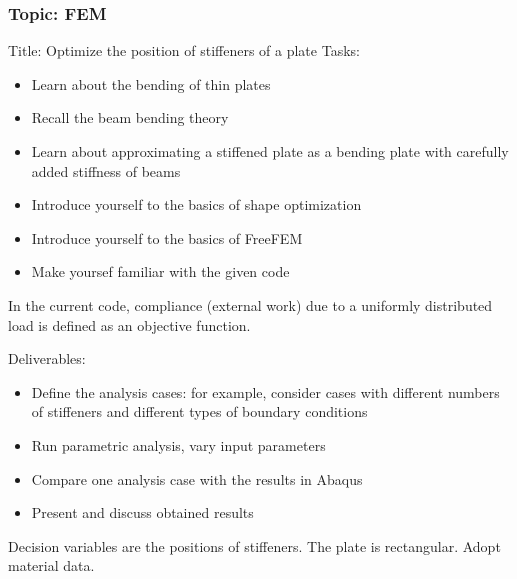 \documentclass[10pt
 ,aspectratio=1610
]{beamer}	%
\begin{document}

% 

\begin{frame}[c]
\frametitle{Topic: FEM}
Title: Optimize the position of stiffeners of a plate
\vfill
Tasks:
\begin{itemize}
    \item Learn about the bending of thin plates
    \item Recall the beam bending theory
    \item Learn about approximating a stiffened plate as a bending plate with carefully added stiffness of beams
    \item Introduce yourself to the basics of shape optimization
    \item Introduce yourself to the basics of FreeFEM 
    \item Make yoursef familiar with the given code

\end{itemize}

In the current code, compliance (external work) due to a uniformly distributed load is defined as an objective function.

\end{frame}

\begin{frame}[c]

Deliverables:
\begin{itemize}

    \item Define the analysis cases: for example, consider cases with different numbers of stiffeners and different types of boundary conditions
    \item Run parametric analysis, vary input parameters
    \item Compare one analysis case with the results in Abaqus
    \item Present and discuss obtained results
\end{itemize}

Decision variables are the positions of stiffeners. The plate is rectangular. Adopt material data.
\vfill

\end{frame}


\end{document}
